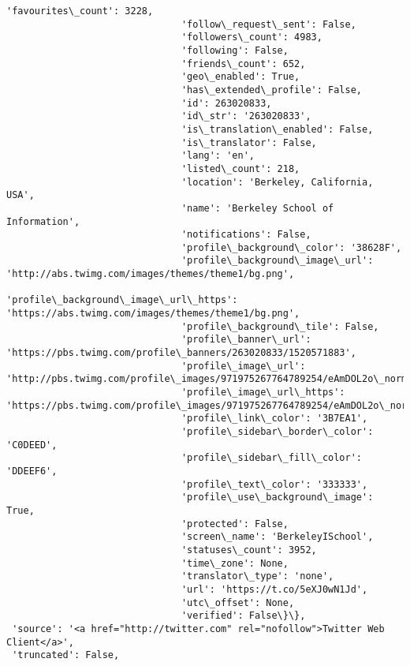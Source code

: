 \documentclass[11pt]{article}
\begin{document}
\begin{Verbatim}[commandchars=\\\{\}]
                               'favourites\_count': 3228,
                               'follow\_request\_sent': False,
                               'followers\_count': 4983,
                               'following': False,
                               'friends\_count': 652,
                               'geo\_enabled': True,
                               'has\_extended\_profile': False,
                               'id': 263020833,
                               'id\_str': '263020833',
                               'is\_translation\_enabled': False,
                               'is\_translator': False,
                               'lang': 'en',
                               'listed\_count': 218,
                               'location': 'Berkeley, California, USA',
                               'name': 'Berkeley School of Information',
                               'notifications': False,
                               'profile\_background\_color': '38628F',
                               'profile\_background\_image\_url': 'http://abs.twimg.com/images/themes/theme1/bg.png',
                               'profile\_background\_image\_url\_https': 'https://abs.twimg.com/images/themes/theme1/bg.png',
                               'profile\_background\_tile': False,
                               'profile\_banner\_url': 'https://pbs.twimg.com/profile\_banners/263020833/1520571883',
                               'profile\_image\_url': 'http://pbs.twimg.com/profile\_images/971975267764789254/eAmDOL2o\_normal.jpg',
                               'profile\_image\_url\_https': 'https://pbs.twimg.com/profile\_images/971975267764789254/eAmDOL2o\_normal.jpg',
                               'profile\_link\_color': '3B7EA1',
                               'profile\_sidebar\_border\_color': 'C0DEED',
                               'profile\_sidebar\_fill\_color': 'DDEEF6',
                               'profile\_text\_color': '333333',
                               'profile\_use\_background\_image': True,
                               'protected': False,
                               'screen\_name': 'BerkeleyISchool',
                               'statuses\_count': 3952,
                               'time\_zone': None,
                               'translator\_type': 'none',
                               'url': 'https://t.co/5eXJ0wN1Jd',
                               'utc\_offset': None,
                               'verified': False\}\},
 'source': '<a href="http://twitter.com" rel="nofollow">Twitter Web Client</a>',
 'truncated': False,

\end{Verbatim}
\end{document}
